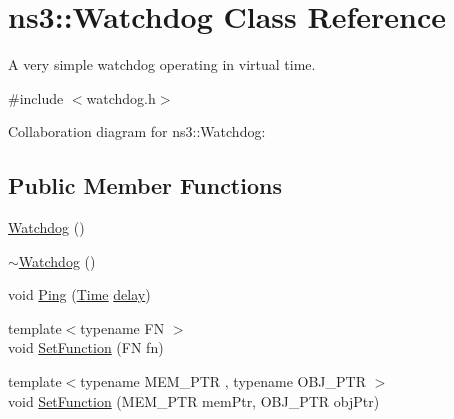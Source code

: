 \hypertarget{classns3_1_1Watchdog}{}\section{ns3\+:\+:Watchdog Class Reference}
\label{classns3_1_1Watchdog}


A very simple watchdog operating in virtual time.  




{\ttfamily \#include $<$watchdog.\+h$>$}



Collaboration diagram for ns3\+:\+:Watchdog\+:
\subsection*{Public Member Functions}
\begin{DoxyCompactItemize}
\item 
\hyperlink{classns3_1_1Watchdog_a955d9cf2f98e2d764fcba018154922c3}{Watchdog} ()
\item 
\hyperlink{classns3_1_1Watchdog_a94829291b00ebc60f24a76be261995a3}{$\sim$\+Watchdog} ()
\item 
void \hyperlink{classns3_1_1Watchdog_a979e51daa6b92c872a78857cfe54c41a}{Ping} (\hyperlink{classns3_1_1Time}{Time} \hyperlink{mmwave_2model_2fading-traces_2fading__trace__generator_8m_a7964e6aa8f61a9d28973c8267a606ad8}{delay})
\item 
{\footnotesize template$<$typename FN $>$ }\\void \hyperlink{classns3_1_1Watchdog_a9b61e573ae12c4604131a595fd474c3b}{Set\+Function} (FN fn)
\item 
{\footnotesize template$<$typename M\+E\+M\+\_\+\+P\+TR , typename O\+B\+J\+\_\+\+P\+TR $>$ }\\void \hyperlink{classns3_1_1Watchdog_a1b6feb6af549c06fd6a1cf1183827357}{Set\+Function} (M\+E\+M\+\_\+\+P\+TR mem\+Ptr, O\+B\+J\+\_\+\+P\+TR obj\+Ptr)
\end{DoxyCompactItemize}
{\bf }\par
